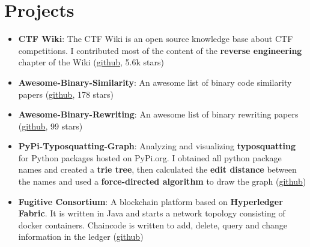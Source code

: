 \documentclass[letterpaper,10pt]{article}
\newcommand{\resumeItem}[2]{
  \item\small{
    \textbf{#1}{: #2 \vspace{-2pt}}
  }
}
\newcommand{\resumeSubItem}[2]{\resumeItem{#1}{#2}\vspace{-4pt}}
\newcommand{\resumeSubHeadingListStart}{\begin{itemize}[leftmargin=*]}
\newcommand{\resumeSubHeadingListEnd}{\end{itemize}}
\newcommand{\shorterSection}[1]{\vspace{-10pt}\section{#1}}
\begin{document}
\shorterSection{\textcolor{titleblue}{Projects}}
  \resumeSubHeadingListStart
    \resumeSubItem{CTF Wiki}
     {
     The CTF Wiki is an open source knowledge base about CTF competitions. I contributed most of the content of the \textbf{reverse engineering} chapter of the Wiki (\href{https://github.com/ctf-wiki/ctf-wiki}{\textcolor{linkblue}{github}}, 5.6k stars)
     }
    \resumeSubItem{Awesome-Binary-Similarity}
      { An awesome list of binary code similarity papers (\href{https://github.com/SystemSecurityStorm/Awesome-Binary-Similarity}{\textcolor{linkblue}{github}}, 178 stars)
	}
    \resumeSubItem{Awesome-Binary-Rewriting}
      { An awesome list of binary rewriting papers (\href{https://github.com/SystemSecurityStorm/Awesome-Binary-Rewriting}{\textcolor{linkblue}{github}}, 99 stars)
	}
	\resumeSubItem{PyPi-Typosquatting-Graph}
     { Analyzing and visualizing \textbf{typosquatting} for Python packages hosted on PyPi.org.  I obtained all python package names and created a \textbf{trie tree}, then calculated the \textbf{edit distance} between the names and used a \textbf{force-directed algorithm} to draw the graph   (\href{https://github.com/Vancir/PyPi-Typosquatting-Graph}{\textcolor{linkblue}{github}})}
    \resumeSubItem{Fugitive Consortium}
      { A blockchain platform based on \textbf{Hyperledger Fabric}. It is written in Java and starts a network topology consisting of docker containers. Chaincode is written to add, delete, query and change information in the ledger  (\href{https://github.com/Vancir/fugitivec}{\textcolor{linkblue}{github}})
	}

  \resumeSubHeadingListEnd
  
  
  
\end{document}
